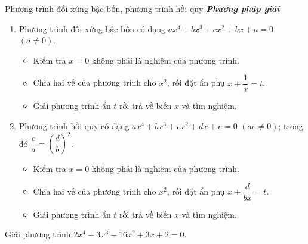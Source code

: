 \begin{dang}{Phương trình đối xứng bậc bốn, phương trình hồi quy}
	\textbf{\textit{Phương pháp giải}}
	\begin{enumerate}
		\item Phương trình đối xứng bậc bốn có dạng $ax^4+bx^3+cx^2+bx+a=0$ $(a\ne 0)$.
		\begin{itemize}
			\item Kiểm tra $x=0$ không phải là nghiệm của phương trình.
			\item Chia hai vế của phương trình cho $x^2$, rồi đặt ẩn phụ $x+\dfrac{1}{x}=t$.
			\item Giải phương trình ẩn $t$ rồi trả về biến $x$ và tìm nghiệm.
		\end{itemize}
	\item Phương trình hồi quy có dạng $ax^4+bx^3+cx^2+dx+e=0$ $(ae\ne 0)$; trong đó $\dfrac{e}{a}=\left( \dfrac{d}{b}\right)^2 $.
	\begin{itemize}
		\item Kiểm tra $x=0$ không phải là nghiệm của phương trình.
		\item Chia hai vế của phương trình cho $x^2$, rồi đặt ẩn phụ $x+\dfrac{d}{bx}=t$.
		\item Giải phương trình ẩn $t$ rồi trả về biến $x$ và tìm nghiệm.
	\end{itemize}
	\end{enumerate}
\end{dang}
\begin{vd}
	Giải phương trình $2x^4+3x^3-16x^2+3x+2=0$.
\end{vd}

